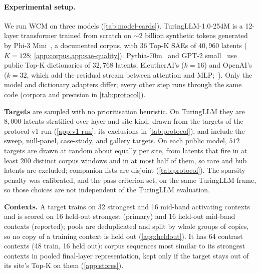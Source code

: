 \documentclass[10pt]{article}
\newif\ifexternal
\DeclareRobustCommand{\pending}[1]{%
  \ifexternal
    \ifvmode\textcolor{black!55}{[to be added]}\else\unskip\fi
  \else
    \textcolor{red!70!black}{[\textit{pending: #1}]}%
  \fi}
\begin{document}
\paragraph{Experimental setup.}
\label{sec:setting}
We run WCM on three models (\cref{tab:model-cards}).
TuringLLM-1.0-254M is a 12-layer transformer trained from scratch on ${\sim}2$ billion synthetic tokens generated by Phi-3 Mini~\citep{abdin2024phi3}, a documented corpus, with 36 Top-K SAEs of $40{,}960$ latents ($K = 128$; \cref{app:corpus,app:sae-quality}).
Pythia-70m~\citep{biderman2023pythia} and GPT-2 small~\citep{radford2019language} use public Top-K dictionaries of $32{,}768$ latents, EleutherAI's ($k = 16$) and OpenAI's ($k = 32$, which add the residual stream between attention and MLP;~\citealp{gao2024scaling}).
Only the model and dictionary adapters differ; every other step runs through the same code (corpora and precision in \cref{tab:protocol}).

\textbf{Targets} are sampled with no prioritisation heuristic.
On TuringLLM they are $8{,}000$ latents stratified over layer and site kind, drawn from the targets of the protocol-v1 run (\cref{app:v1-run}; its exclusions in \cref{tab:protocol}), and include the sweep, null-panel, case-study, and gallery targets.
On each public model, $512$ targets are drawn at random about equally per site, from latents that fire in at least $200$ distinct corpus windows and in at most half of them, so rare and hub latents are excluded; companion lists are disjoint (\cref{tab:protocol}).
The sparsity penalty was calibrated, and the pass criterion set, on the same TuringLLM frame, so those choices are not independent of the TuringLLM evaluation.

\textbf{Contexts.}
A target trains on 32 strongest and 16 mid-band activating contexts and is scored on 16 held-out strongest (primary) and 16 held-out mid-band contexts (reported); pools are deduplicated and split by whole groups of copies, so no copy of a training context is held out (\cref{app:heldout}).
It has 64 contrast contexts (48 train, 16 held out): corpus sequences most similar to its strongest contexts in pooled final-layer representation, kept only if the target stays out of its site's Top-K on them (\cref{app:stores}).
\end{document}
